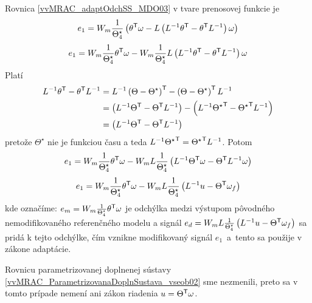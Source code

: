 \documentclass[a4paper, 10pt, ]{article}
\begin{document}
Rovnica \eqref{vvMRAC_adaptOdchSS_MDO03} v tvare prenosovej funkcie je
\begin{equation}
	e_1 = W_m \frac{1}{\Theta_4^\star} \left( \theta^{\mathsf{T}} \omega - L \left( L^{-1} \theta^{\mathsf{T}} - \theta^{\mathsf{T}} L^{-1} \right) \omega \right)
\end{equation}
\begin{equation}
	e_1 = W_m \frac{1}{\Theta_4^\star} \theta^{\mathsf{T}} \omega - W_m \frac{1}{\Theta_4^\star} L \left( L^{-1} \theta^{\mathsf{T}} - \theta^{\mathsf{T}} L^{-1} \right) \omega
\end{equation}
Platí
\begin{align}
    \begin{split}
    	L^{-1} \theta^{\mathsf{T}} - \theta^{\mathsf{T}} L^{-1}
        &=
    	L^{-1} \left( \Theta - \Theta^\star \right)^{\mathsf{T}} - \left( \Theta - \Theta^\star \right)^{\mathsf{T}} L^{-1} \\
        &=
    	\left( L^{-1} \Theta^{\mathsf{T}} - \Theta^{\mathsf{T}} L^{-1} \right) - \left( L^{-1} {\Theta^\star}^{\mathsf{T}} - {\Theta^\star}^{\mathsf{T}} L^{-1} \right) \\
        &=
    	\left( L^{-1} \Theta^{\mathsf{T}} - \Theta^{\mathsf{T}} L^{-1} \right)
    \end{split}
\end{align}
pretože $\Theta^\star$ nie je funkciou času a teda $L^{-1} {\Theta^\star}^{\mathsf{T}} = {\Theta^\star}^{\mathsf{T}}  L^{-1}$. Potom
\begin{equation}
	e_1 = W_m \frac{1}{\Theta_4^\star} \theta^{\mathsf{T}} \omega - W_m L \frac{1}{\Theta_4^\star} \left( L^{-1} \Theta^{\mathsf{T}} \omega - \Theta^{\mathsf{T}} L^{-1} \omega \right)
\end{equation}
\begin{equation}
	e_1 = W_m \frac{1}{\Theta_4^\star} \theta^{\mathsf{T}} \omega - W_m L \frac{1}{\Theta_4^\star} \left( L^{-1} u - \Theta^{\mathsf{T}} \omega_f \right)
\end{equation}
kde označíme: $e_m = W_m \frac{1}{\Theta_4^\star} \theta^{\mathsf{T}} \omega$ je odchýlka medzi výstupom pôvodného nemodifikovaného referenčného modelu a signál $e_d = W_m L \frac{1}{\Theta_4^\star} \left( L^{-1} u - \Theta^{\mathsf{T}} \omega_f \right) $ sa pridá k tejto odchýlke, čím vznikne modifikovaný signál $e_1$~a~tento sa použije v zákone adaptácie.

Rovnicu parametrizovanej doplnenej sústavy \eqref{vvMRAC_ParametrizovanaDoplnSustava_vseob02} sme nezmenili, preto sa v tomto prípade nemení ani zákon riadenia $u = \Theta^{\mathsf{T}} \omega$.
\end{document}
